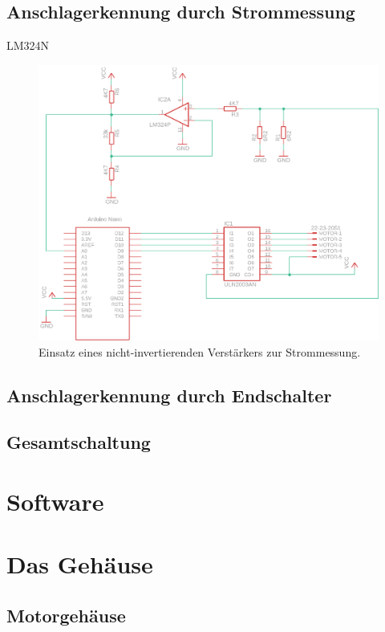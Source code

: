 \documentclass[11pt, titlepage, fleqn]{report}
\begin{document}
			\subsection{Anschlagerkennung durch Strommessung}
				LM324N
				\begin{figure}[htbp]
					\centering
					\includegraphics[width=\linewidth]{./img/op2.png}
					\caption{Einsatz eines nicht-invertierenden Verstärkers zur Strommessung.
					\label{fig:imgOP}}
				\end{figure}
			\newpage
			\subsection{Anschlagerkennung durch Endschalter}
			\subsection{Gesamtschaltung}
		\section{Software}
		\section{Das Gehäuse}
			\subsection{Motorgehäuse}
\end{document}
